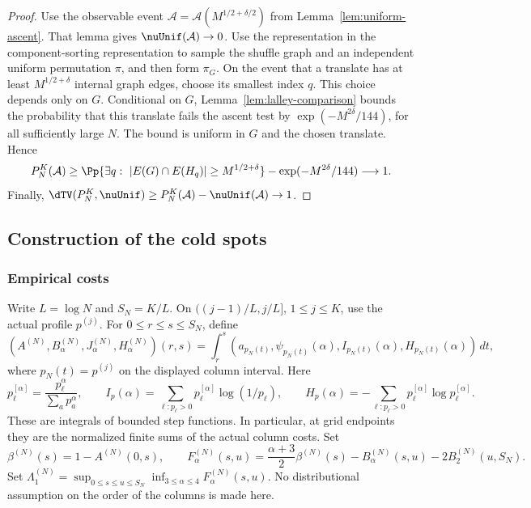 \begin{proof}
Use the observable event
\(\mathcal A=\mathcal A(M^{1/2+\delta/2})\) from
Lemma~\ref{lem:uniform-ascent}.  That lemma gives
\(\nuUnif(\mathcal A)\to0\).
Use the representation in the component-sorting representation
to sample the shuffle graph and an independent uniform permutation
\(\pi\), and then form \(\pi_G\).
On the event that a translate has at least
\(M^{1/2+\delta}\) internal graph edges, choose its smallest index
\(q\).  This choice depends only on \(G\).
Conditional on \(G\), Lemma~\ref{lem:lalley-comparison} bounds the
probability that this translate fails the ascent test by
\(\exp(-M^{2\delta}/144)\), for all sufficiently large \(N\).
The bound is uniform in \(G\) and the chosen translate.  Hence
\[
  P_N^K(\mathcal A)
  \ge
  \Pp\{\exists q:\ |E(G)\cap E(H_q)|\ge M^{1/2+\delta}\}
     -\exp(-M^{2\delta}/144)
  \longrightarrow1.
\]
Finally,
\(\dTV(P_N^{K},\nuUnif)
\ge P_N^K(\mathcal A)-\nuUnif(\mathcal A)\to1\).
\end{proof}

\subsection{Construction of the cold spots}
\subsubsection{Empirical costs}

Write $L=\log N$ and $S_N=K/L$.  On
$((j-1)/L,j/L]$, $1\le j\le K$, use the actual profile $p^{(j)}$.
For $0\le r\le s\le S_N$, define
\[
 (A^{(N)},B_\alpha^{(N)},J_\alpha^{(N)},H_\alpha^{(N)})(r,s)
 =\int_r^s(a_{p_N(t)},\psi_{p_N(t)}(\alpha),
                 I_{p_N(t)}(\alpha),H_{p_N(t)}(\alpha))\,dt,
\]
where $p_N(t)=p^{(j)}$ on the displayed column interval.
Here
\[
 p^{[\alpha]}_\ell=\frac{p_\ell^\alpha}{\sum_a p_a^\alpha},\qquad
 I_p(\alpha)=\sum_{\ell:p_\ell>0}p^{[\alpha]}_\ell\log(1/p_\ell),\qquad
 H_p(\alpha)=-\sum_{\ell:p_\ell>0}p^{[\alpha]}_\ell\log p^{[\alpha]}_\ell.
\]
These are integrals of bounded step functions.  In particular, at grid
endpoints they are the normalized finite sums of the actual column costs.
Set
\[
 \beta^{(N)}(s)=1-A^{(N)}(0,s),\qquad
 F_\alpha^{(N)}(s,u)=\frac{\alpha+3}{2}\beta^{(N)}(s)
                 -B_\alpha^{(N)}(s,u)-2B_2^{(N)}(u,S_N).
\]
Set $\Lambda_1^{(N)}=\sup_{0\le s\le u\le S_N}
\inf_{3\le\alpha\le4}F_\alpha^{(N)}(s,u)$.
No distributional assumption on the order of the columns is made here.

